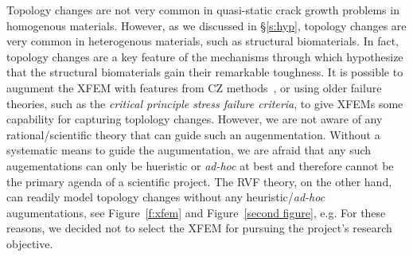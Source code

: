 \documentclass[10pt,letterpaper]{article}
\begin{document}
    Topology changes are not very common in quasi-static crack growth problems in homogenous materials. However, as we discussed in \S \ref{s:hyp},  topology changes are very common in heterogenous materials, such  as structural biomaterials. In fact,  topology changes are a key feature of the  mechanisms  through which  hypothesize that the structural biomaterials  gain their remarkable   toughness. It is possible to augument the XFEM with features from CZ methods~\cite{wells2001new,moes2002extended,mariani2003extended}, or using older failure theories, such as the  \textit{critical principle stress failure criteria}, to give XFEMs some capability  for capturing toplology changes. However, we are not aware of any rational/scientific  theory that can guide such an augenmentation. Without a systematic means  to  guide the augumentation, we are afraid  that any such augementations can only be  hueristic or \textit{ad-hoc}  at best and therefore cannot be the primary agenda of a scientific project. The  RVF theory, on the other hand, can readily model topology  changes without any heuristic/\textit{ad-hoc} augumentations, see  Figure~\ref{f:xfem} and Figure~\ref{second figure}, e.g.   For these reasons, we decided not to select the XFEM for  pursuing  the  project's research objective.
\end{document}
